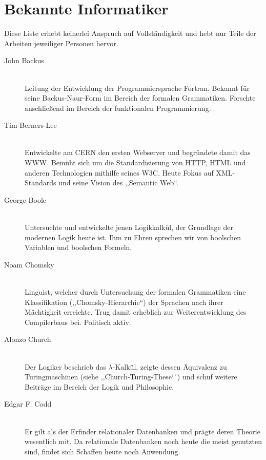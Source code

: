 \chapter{Bekannte Informatiker}
%
Diese Liste erhebt keinerlei Anspruch auf Vollständigkeit und hebt nur Teile der Arbeiten jeweiliger Personen hervor.
%
\begin{description}
  \item[John Backus ] \hfill{} \\
    Leitung der Entwicklung der Programmiersprache Fortran.
    Bekannt für seine Backus-Naur-Form im Bereich der formalen Grammatiken.
    Forschte anschließend im Bereich der funktionalen Programmierung.

   \item[Tim Berners-Lee ] \hfill{} \\
    Entwickelte am CERN den ersten Webserver und begründete damit das WWW.
    Bemüht sich um die Standardisierung von HTTP, HTML und anderen Technologien mithilfe seines W3C.
    Heute Fokus auf XML-Standards und seine Vision des ,,Semantic Web``.

  \item[George Boole ] \hfill{} \\
    Untersuchte und entwickelte jenen Logikkalkül, der Grundlage der modernen Logik heute ist.
    Ihm zu Ehren sprechen wir von boolschen Variablen und boolschen Formeln.

  \item[Noam Chomsky ] \hfill{} \\
    Linguist, welcher durch Untersuchung der formalen Grammatiken eine Klassifikation (,,Chomsky-Hierarchie``) der Sprachen nach ihrer Mächtigkeit erreichte.
    Trug damit erheblich zur Weiterentwicklung des Compilerbaus bei.
    Politisch aktiv.

  \item[Alonzo Church ] \hfill{} \\
    Der Logiker beschrieb das $\lambda$-Kalkül, zeigte dessen Äquivalenz zu Turingmaschinen (siehe ,,Church-Turing-These`´) und schuf weitere Beiträge im Bereich der Logik und Philosophie.

  \item[Edgar F. Codd ] \hfill{} \\
    Er gilt als der Erfinder relationaler Datenbanken und prägte deren Theorie wesentlich mit. Da relationale Datenbanken noch heute die meist genutzten sind, findet sich Schaffen heute noch  Anwendung.


\end{description}
